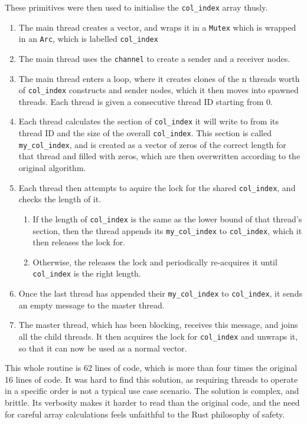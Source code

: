 These primitives were then used to initialise the \texttt{col\_index} array thusly.

\begin{enumerate}
    \item The main thread creates a vector, and wraps it in a \texttt{Mutex} which is wrapped in an \texttt{Arc}, which is labelled \texttt{col\_index}
    \item The main thread uses the \texttt{channel} to create a sender and a receiver nodes.
    \item The main thread enters a loop, where it creates clones of the n threads worth of \texttt{col\_index} constructs and sender nodes, which it then moves into spawned threads. Each thread is given a consecutive thread ID starting from 0.
    \item Each thread calculates the section of \texttt{col\_index} it will write to from its thread ID and the size of the overall \texttt{col\_index}. This section is called \texttt{my\_col\_index}, and is created as a vector of zeros of the correct length for that thread and filled with zeros, which are then overwritten according to the original algorithm.
    \item Each thread then attempts to aquire the lock for the shared \texttt{col\_index}, and checks the length of it.
    \begin{enumerate}
        \item If the length of \texttt{col\_index} is the same as the lower bound of that thread's section, then the thread appends its \texttt{my\_col\_index} to \texttt{col\_index}, which it then releases the lock for.
        \item Otherwise, the releases the lock and periodically re-acquires it until \texttt{col\_index} is the right length.
    \end{enumerate}
\item Once the last thread has appended their \texttt{my\_col\_index} to \texttt{col\_index}, it sends an empty message to the master thread.
\item The master thread, which has been blocking, receives this message, and joins all the child threads. It then acquires the lock for \texttt{col\_index} and unwraps it, so that it can now be used as a normal vector.
\end{enumerate}

This whole routine is 62 lines of code, which is more than four times the original 16 lines of code. It was hard to find this solution, as requiring threads to operate in a specific order is not a typical use case scenario. 
The solution is complex, and brittle. Its verbosity makes it harder to read than the original code, and the need for careful array calculations feels unfaithful to the Rust philosophy of safety.

